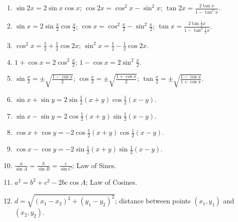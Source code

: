 \begin{enumerate}
\item
$\sin 2x = 2 \sin x \cos x$;
$\cos 2x = \cos^2x - \sin^2x$;
$\tan 2x = \displaystyle{ \frac{2 \tan x}{1 - \tan^2x} }$.

\item
$\sin x = 2 \sin \frac{x}{2} \cos \frac{x}{2}$;
$\cos x = \cos^2 \frac{x}{2} - \sin^2 \frac{x}{2}$;
$\tan x = \displaystyle{ \frac{2 \tan \frac{1}{2} x}{1 - \tan^2 \frac{1}{2}x} }$.

\item
$\cos^2 x = \frac{1}{2} + \frac{1}{2} \cos 2x$;
$\sin^2 x = \frac{1}{2} - \frac{1}{2} \cos 2x$.

\item
$1 + \cos x = 2 \cos^2 \frac{x}{2}$;
$1 - \cos x = 2 \sin^2 \frac{x}{2}$.

\item
$\sin \frac{x}{2} = \pm \displaystyle{ \sqrt{ \frac{1 - \cos x}{2} } }$;
$\cos \frac{x}{2} = \pm \displaystyle{ \sqrt{ \frac{1 + \cos x}{2} } }$;
$\tan \frac{x}{2} = \pm \displaystyle{ \sqrt{ \frac{1 - \cos x}{1 + \cos x} } }$.

\item
$\sin x + \sin y = 2 \sin \frac{1}{2} \left(x + y\right) \cos \frac{1}{2} \left(x - y\right)$.

\item
$\sin x - \sin y = 2 \cos \frac{1}{2} \left(x + y\right) \sin \frac{1}{2} \left(x - y\right)$.

\item
$\cos x + \cos y = -2 \cos \frac{1}{2} \left(x + y\right) \cos \frac{1}{2} \left(x - y\right)$.

\item
$\cos x - \cos y = -2 \sin \frac{1}{2} \left(x + y\right) \sin \frac{1}{2} \left(x - y\right)$.

\item
$\displaystyle{ \frac{a}{\sin A} = \frac{b}{\sin B} = \frac{c}{\sin C}}$; Law of Sines.

\item
$a^2 = b^2 + c^2 - 2bc \cos A$; Law of Cosines.

\item
$d = \sqrt{\left(x_1 - x_2\right)^2 + \left(y_1 - y_2\right)^2}$;
distance between points $\left(x_1, y_1\right)$ and $\left(x_2, y_2\right)$.


\end{enumerate}
